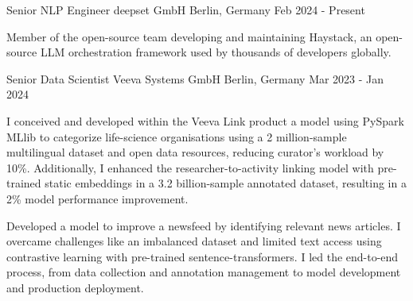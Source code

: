 

\begin{cventries}
  \cventry
    {Senior NLP Engineer} %
    {deepset GmbH} %
    {Berlin, Germany} %
    {Feb 2024 - Present} %
	{
      \begin{cvitems} %
		\item {Member of the open-source team developing and maintaining Haystack, an open-source LLM orchestration framework used by thousands of developers globally.}
      \end{cvitems}
    }





  \cventry
    {Senior Data Scientist} %
    {Veeva Systems GmbH} %
    {Berlin, Germany} %
    {Mar 2023 - Jan 2024} %
	{
      \begin{cvitems} %
		\item {I conceived and developed within the Veeva Link product a model using PySpark MLlib to categorize life-science organisations using a 2 million-sample multilingual dataset and open data resources, reducing curator's workload by 10\%. Additionally, I enhanced the researcher-to-activity linking model with pre-trained static embeddings in a 3.2 billion-sample annotated dataset, resulting in a 2\% model performance improvement.}
		\item {Developed a model to improve a newsfeed by identifying relevant news articles. I overcame challenges like an imbalanced dataset and limited text access using contrastive learning with pre-trained sentence-transformers. I led the end-to-end process, from data collection and annotation management to model development and production deployment.}
      \end{cvitems}
    }
	

\end{cventries}
